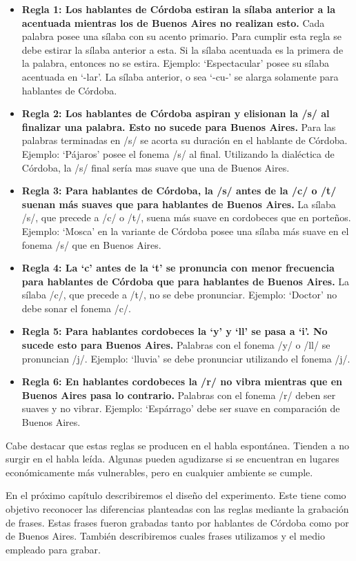 \begin{itemize}

\item \textbf{Regla 1: Los hablantes de Córdoba estiran la sílaba anterior a la acentuada mientras los de Buenos Aires no realizan esto.} Cada palabra posee una sílaba con su acento primario. Para cumplir esta regla se debe estirar la sílaba anterior a esta. Si la sílaba acentuada es la primera de la palabra, entonces no se estira. Ejemplo: `Espectacular' posee su sílaba acentuada en `-lar'. La sílaba anterior, o sea `-cu-' se alarga solamente para hablantes de Córdoba. 

\item \textbf{Regla 2: Los hablantes de Córdoba aspiran y elisionan la /s/ al finalizar una palabra. Esto no sucede para Buenos Aires.} Para las palabras terminadas en /s/ se acorta su duración en el hablante de Córdoba. Ejemplo: `Pájaros' posee el fonema /s/ al final. Utilizando la dialéctica de Córdoba, la /s/ final sería mas suave que una de Buenos Aires. 

\item \textbf{Regla 3: Para hablantes de Córdoba, la /s/ antes de la /c/ o /t/ suenan más suaves que para hablantes de Buenos Aires.} La sílaba /s/, que precede a /c/ o /t/, suena más suave en cordobeces que en porteños. Ejemplo: `Mosca' en la variante de Córdoba posee una sílaba más suave en el fonema /s/ que en Buenos Aires. 

\item \textbf{Regla 4: La `c' antes de la `t' se pronuncia con menor frecuencia para hablantes de Córdoba que para hablantes de Buenos Aires.} La sílaba /c/, que precede a /t/, no se debe pronunciar. Ejemplo: `Doctor' no debe sonar el fonema /c/.

\item \textbf{Regla 5: Para hablantes cordobeces la `y’ y `ll’ se pasa a `i’. No sucede esto para Buenos Aires.} Palabras con el fonema /y/ o /ll/ se pronuncian /j/. Ejemplo: `lluvia' se debe pronunciar utilizando el fonema /j/. 

\item \textbf{Regla 6: En hablantes cordobeces la /r/ no vibra mientras que en Buenos Aires pasa lo contrario.} Palabras con el fonema /r/ deben ser suaves y no vibrar. Ejemplo: `Espárrago' debe ser suave en comparación de Buenos Aires. 

\end{itemize}

Cabe destacar que estas reglas se producen en el habla espontánea. Tienden a no surgir en el habla leída. Algunas pueden agudizarse si se encuentran en lugares económicamente más vulnerables, pero en cualquier ambiente se cumple.

En el próximo capítulo describiremos el diseño del experimento. Este tiene como objetivo reconocer las diferencias planteadas con las reglas mediante la grabación de frases. Estas frases fueron grabadas tanto por hablantes de Córdoba como por de Buenos Aires. También describiremos cuales frases utilizamos y el medio empleado para grabar.
